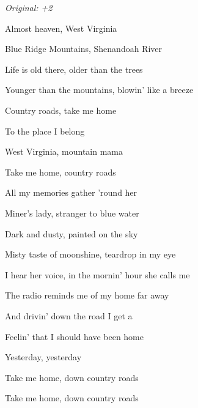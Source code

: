 \begin{song}


\begin{strumbox}
\textit{Original: +2}
\end{strumbox}

\begin{hchordbox}
\end{hchordbox}

\Large

\bigskip

 Almost heaven,  West Virginia \par
{} Blue Ridge Mountains, Shenandoah River \par
{} Life is old there, older than the trees \par
{}Younger than the mountains, blowin' like a breeze \par

\bigskip

\begin{chorusbox}{\Chorus}
Country roads, take me home \par
To the place I belong \par
West Virginia, mountain mama \par
Take me home, country roads \par
\end{chorusbox}

\bigskip

 All my memories  gather 'round her \par
{} Miner's lady, stranger to blue water \par
{} Dark and dusty, painted on the sky \par
{}Misty taste of moonshine, teardrop in my eye \par

\bigskip

\Chorus

\bigskip

 I hear her voice, in the mornin' hour she calls me \par
The radio reminds me of my home far away \par
And drivin' down the road I get a \par
{}Feelin' that I should have been home \par
{}Yesterday, yesterday \par

\bigskip

\Chorus {}

\bigskip

Take me home, down country roads \par
Take me home, down country roads \par

\end{song}
